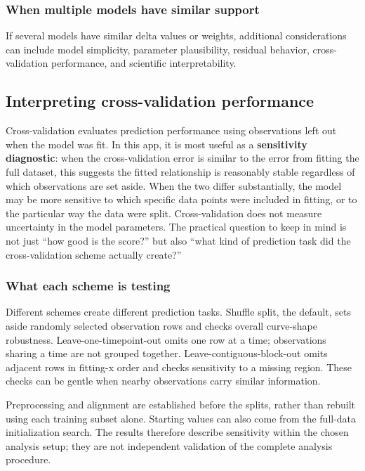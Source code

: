 \subsubsection*{When multiple models have similar support}

If several models have similar delta values or weights, additional considerations can include model simplicity, parameter plausibility, residual behavior, cross-validation performance, and scientific interpretability.


\subsection{Interpreting cross-validation performance}

Cross-validation evaluates prediction performance using observations left out when the model was fit. In this app, it is most useful as a \textbf{sensitivity diagnostic}: when the cross-validation error is similar to the error from fitting the full dataset, this suggests the fitted relationship is reasonably stable regardless of which observations are set aside. When the two differ substantially, the model may be more sensitive to which specific data points were included in fitting, or to the particular way the data were split. Cross-validation does not measure uncertainty in the model parameters. The practical question to keep in mind is not just ``how good is the score?'' but also ``what kind of prediction task did the cross-validation scheme actually create?''

\subsubsection*{What each scheme is testing}

Different schemes create different prediction tasks. Shuffle split, the default, sets aside randomly selected observation rows and checks overall curve-shape robustness. Leave-one-timepoint-out omits one row at a time; observations sharing a time are not grouped together. Leave-contiguous-block-out omits adjacent rows in fitting-x order and checks sensitivity to a missing region. These checks can be gentle when nearby observations carry similar information.

Preprocessing and alignment are established before the splits, rather than rebuilt using each training subset alone. Starting values can also come from the full-data initialization search. The results therefore describe sensitivity within the chosen analysis setup; they are not independent validation of the complete analysis procedure.


